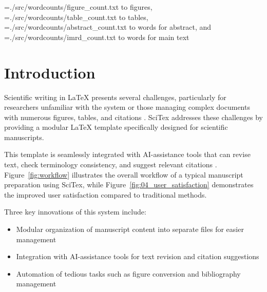 \documentclass[preprint,review,12pt]{elsarticle}\n
\newcommand\readwordcount[1]{%
  \openin\wordcount=#1
  \read\wordcount to \thewordcount
  \closein\wordcount
  \thewordcount
}
\begin{document}
\begin{wordcount}
\readwordcount{./src/wordcounts/figure_count.txt} figures, \readwordcount{./src/wordcounts/table_count.txt} tables, \readwordcount{./src/wordcounts/abstract_count.txt} words for abstract, and \readwordcount{./src/wordcounts/imrd_count.txt} words for main text
\end{wordcount}

\n


\section{Introduction}
\label{sec:introduction}

Scientific writing in LaTeX presents several challenges, particularly for researchers unfamiliar with the system or those managing complex documents with numerous figures, tables, and citations \cite{Smith2020}. SciTex addresses these challenges by providing a modular LaTeX template specifically designed for scientific manuscripts. 

This template is seamlessly integrated with AI-assistance tools that can revise text, check terminology consistency, and suggest relevant citations \cite{Johnson2023}. Figure~\ref{fig:workflow} illustrates the overall workflow of a typical manuscript preparation using SciTex, while Figure~\ref{fig:04_user_satisfaction} demonstrates the improved user satisfaction compared to traditional methods.


Three key innovations of this system include:

\begin{itemize}
    \item Modular organization of manuscript content into separate files for easier management
    \item Integration with AI-assistance tools for text revision and citation suggestions
    \item Automation of tedious tasks such as figure conversion and bibliography management
\end{itemize}
\end{document}
